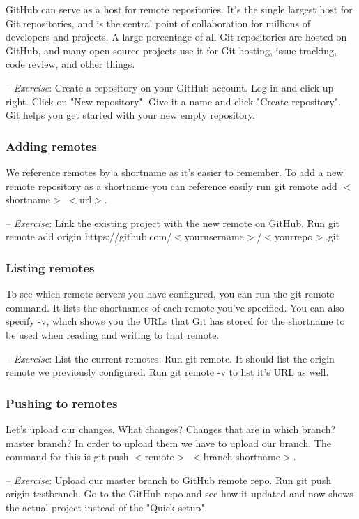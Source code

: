 \documentclass[12pt,a4]{article}
\newcommand{\ilcode}[1]{\textcolor[RGB]{160, 110, 220}{#1}}
\begin{document}
GitHub can serve as a host for remote repositories. It's the single largest host
for Git repositories, and is the central point of collaboration for millions of
developers and projects. A large percentage of all Git repositories are hosted
on GitHub, and many open-source projects use it for Git hosting, issue tracking,
code review, and other things.

{\sf -- \emph{Exercise}:} Create a repository on your GitHub account. Log in and
click up right. Click on "New repository". Give it a name and click "Create
repository". Git helps you get started with your new empty repository.

\subsubsection{Adding remotes}
We reference remotes by a shortname as it's easier to remember. To add a new
remote repository as a shortname you can reference easily run \ilcode{git remote
add $<$shortname$>$ $<$url$>$}.

{\sf -- \emph{Exercise}:} Link the existing project with the new remote on
GitHub. Run \ilcode{git remote add origin
https://github.com/$<$yourusername$>$/$<$yourrepo$>$.git}

\subsubsection{Listing remotes}
To see which remote servers you have configured, you can run the \ilcode{git
remote} command. It lists the shortnames of each remote you’ve specified. You
can also specify \ilcode{-v}, which shows you the URLs that Git has stored for
the shortname to be used when reading and writing to that remote.

{\sf -- \emph{Exercise}:} List the current remotes. Run \ilcode{git remote}. It
should list the origin remote we previously configured. Run \ilcode{git remote
-v} to list it's URL as well.

\subsubsection{Pushing to remotes}
Let's upload our changes. What changes? Changes that are in which branch? master
branch? In order to upload them we have to upload our branch. The command for
this is \ilcode{git push $<$remote$>$ $<$branch-shortname$>$}.

{\sf -- \emph{Exercise}:} Upload our master branch to GitHub remote repo. Run
\ilcode{git push origin testbranch}. Go to the GitHub repo and see how it
updated and now shows the actual project instead of the "Quick setup".
\end{document}
